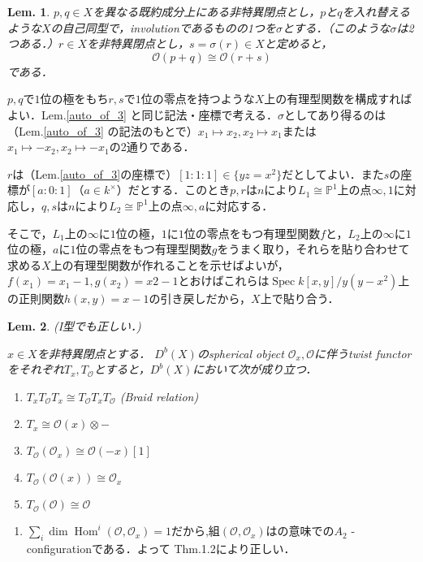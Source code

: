 \documentclass[uplatex,a4paper,11pt]{jsarticle}
\makeatletter
\theoremstyle{mystyle} %
\newtheorem{lemma}{Lem.}[section]
\renewenvironment{proof}[1][\proofname]{\par
 \pushQED{\qed}%
 \normalfont \topsep6\p@\@plus6\p@\relax
 \trivlist
 \item[\hskip\labelsep
 \itshape
 {\bf\underline{#1}}]\ignorespaces
}{%
 \popQED\endtrivlist\@endpefalse
}
\DeclareMathOperator{\Spec}{Spec}
\DeclareMathOperator{\Hom}{Hom}
\makeatother
\begin{document}
\begin{lemma}\label{iso_of_line_bundles}
	$p,q \in X$を異なる既約成分上にある非特異閉点とし，$p$と$q$を入れ替えるような$X$の自己同型で，involutionであるものの1つを$\sigma$とする．（このような$\sigma$は2つある．）$r \in X$を非特異閉点とし，$s = \sigma(r)\in X$と定めると，$$\mathcal{O}(p + q)\cong \mathcal{O}(r + s)$$である．
\end{lemma}
\begin{proof}
	$p,q$で$1$位の極をもち$r,s$で$1$位の零点を持つような$X$上の有理型関数を構成すればよい．Lem.\ref{auto_of_3} と同じ記法・座標で考える．$\sigma$としてあり得るのは（Lem.\ref{auto_of_3} の記法のもとで）$x_1 \mapsto x_2, x_2 \mapsto x_1$または$x_1 \mapsto - x_2, x_2 \mapsto - x_1$の2通りである．

	$r$は（Lem.\ref{auto_of_3}の座標で）$[1:1:1]\in\{yz=x^2\}$だとしてよい．また$s$の座標が$[a:0:1]$（$a \in k^\times$）だとする．このとき$p, r$は$n$により$L_1 \cong \mathbb{P}^1$上の点$\infty, 1$に対応し，$q,s$は$n$により$L_2 \cong \mathbb{P}^1$上の点$\infty, a$に対応する．

	そこで，$L_1$上の$\infty$に$1$位の極，$1$に$1$位の零点をもつ有理型関数$f$と，$L_2$上の$\infty$に$1$位の極，$a$に$1$位の零点をもつ有理型関数$g$をうまく取り，それらを貼り合わせて求める$X$上の有理型関数が作れることを示せばよいが，$f(x_1)=x_1 - 1, g(x_2)=x2 - 1$とおけばこれらは$\Spec k[x,y]/y(y - x^2)$上の正則関数$h(x,y)=x - 1$の引き戻しだから，$X$上で貼り合う．
\end{proof}

\begin{lemma}\label{calc_of_twist_functors}
	(I型でも正しい．)

	$x \in X$を非特異閉点とする．
	$D^b(X)$のspherical object $\mathcal{O}_x, \mathcal{O}$に伴うtwist functorをそれぞれ$T_x, T_{\mathcal{O}}$とすると，$D^b(X)$において次が成り立つ．
	\begin{enumerate}
		\item $T_x T_\mathcal{O}T_x \cong T_\mathcal{O}T_x T_\mathcal{O}$ (Braid relation)
		\item $T_x\cong\mathcal{O}(x) \otimes - $
		\item $T_{\mathcal{O}}(\mathcal{O}_x)\cong\mathcal{O}( - x)[1]$
		\item $T_{\mathcal{O}}(\mathcal{O}(x))\cong\mathcal{O}_x$
		\item $T_{\mathcal{O}}(\mathcal{O})\cong\mathcal{O}$
	\end{enumerate}
\end{lemma}
\begin{proof}
	\begin{enumerate}
		\item $\sum_{i} \dim \Hom^i (\mathcal{O}, \mathcal{O}_x)=1$だから,組$(\mathcal{O}, \mathcal{O}_x)$は\cite{ST01}の意味での$A_2$ - configurationである．よって\cite{ST01} Thm.1.2により正しい．
	\end{enumerate}
\end{proof}
\end{document}
